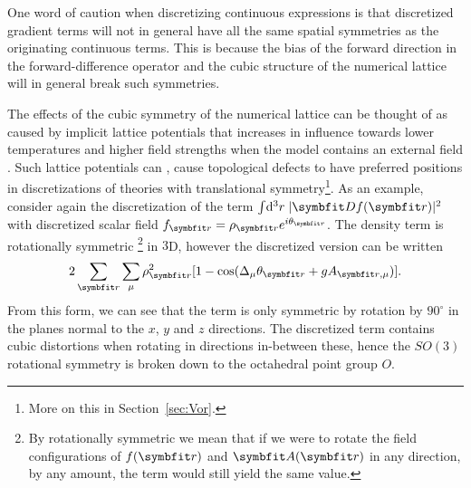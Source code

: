 One word of caution when discretizing continuous expressions is that discretized gradient terms will not in general have all the same spatial symmetries
as the originating continuous terms. This is because the bias of the forward direction in the forward-difference operator and the cubic structure of the numerical
lattice will in general break such symmetries.

The effects of the cubic symmetry of the numerical lattice can be thought of as caused by
implicit lattice potentials that increases in influence towards lower temperatures and higher field strengths when the model contains an external
field \cite{Li93}. Such lattice potentials can \eg, cause topological defects to have
preferred positions in discretizations of theories with translational symmetry\footnote{More on this in Section~\ref{sec:Vor}.}.
As an example, consider again the discretization of the term
$\int\!\mathrm{d}^3r\;|\v{D}f(\v{r})|^2$ with discretized scalar field $f_\v{r}=\rho_\v{r}e^{i\theta_\v{r}}$. The density term is rotationally
symmetric%
\footnote{By rotationally symmetric we mean that if we were to rotate the field configurations of $f(\v{r})$ and $\v{A}(\v{r})$ in any direction,
by any amount, the term would still yield the same value.}
 in $3$D, however the discretized version can be written
\begin{equation}
    \label{eq:LM:Derivatives:discretizedKineticTerm}
    2\sum_\v{r}\sum_\mu\rho_\v{r}^2[1-\cos(\Delta_\mu \theta_\v{r}+gA_{\v{r},\mu})].
\end{equation}
From this form, we can see that the term is only symmetric by rotation by $90^\circ$ in the planes normal to the $x$, $y$ and $z$ directions.
The discretized term contains cubic distortions when rotating in directions in-between these, hence the $SO(3)$ rotational symmetry is broken
down to the octahedral point group $O$.

